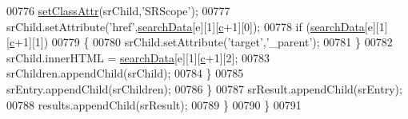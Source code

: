 \begin{DoxyCode}
00776         \hyperlink{search_8js_a499422fc054a5278ae32801ec0082c56}{setClassAttr}(srChild,\textcolor{stringliteral}{'SRScope'});
00777         srChild.setAttribute(\textcolor{stringliteral}{'href'},\hyperlink{all__0_8js_ad01a7523f103d6242ef9b0451861231e}{searchData}[e][1][\hyperlink{jquery_8js_abce695e0af988ece0826d9ad59b8160d}{c}+1][0]);
00778         \textcolor{keywordflow}{if} (\hyperlink{all__0_8js_ad01a7523f103d6242ef9b0451861231e}{searchData}[e][1][\hyperlink{jquery_8js_abce695e0af988ece0826d9ad59b8160d}{c}+1][1])
00779         \{
00780          srChild.setAttribute(\textcolor{stringliteral}{'target'},\textcolor{stringliteral}{'\_parent'});
00781         \}
00782         srChild.innerHTML = \hyperlink{all__0_8js_ad01a7523f103d6242ef9b0451861231e}{searchData}[e][1][\hyperlink{jquery_8js_abce695e0af988ece0826d9ad59b8160d}{c}+1][2];
00783         srChildren.appendChild(srChild);
00784       \}
00785       srEntry.appendChild(srChildren);
00786     \}
00787     srResult.appendChild(srEntry);
00788     results.appendChild(srResult);
00789   \}
00790 \}
00791 
\end{DoxyCode}

